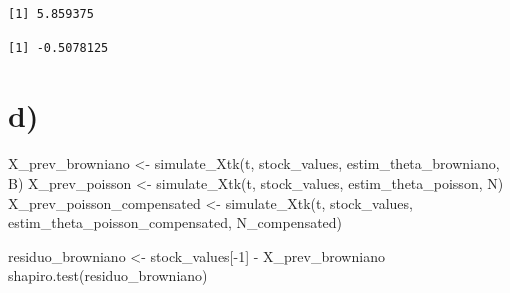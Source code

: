 \documentclass[
  letterpaper,
  DIV=11,
  numbers=noendperiod]{scrreprt}
\newenvironment{Shaded}{\begin{snugshade}}{\end{snugshade}}
\newcommand{\AttributeTok}[1]{\textcolor[rgb]{0.40,0.45,0.13}{#1}}
\newcommand{\DecValTok}[1]{\textcolor[rgb]{0.68,0.00,0.00}{#1}}
\newcommand{\DocumentationTok}[1]{\textcolor[rgb]{0.37,0.37,0.37}{\textit{#1}}}
\newcommand{\FunctionTok}[1]{\textcolor[rgb]{0.28,0.35,0.67}{#1}}
\newcommand{\NormalTok}[1]{\textcolor[rgb]{0.00,0.23,0.31}{#1}}
\newcommand{\OtherTok}[1]{\textcolor[rgb]{0.00,0.23,0.31}{#1}}
\newcommand{\SpecialCharTok}[1]{\textcolor[rgb]{0.37,0.37,0.37}{#1}}
\begin{document}
\begin{Shaded}
\end{Shaded}

\begin{verbatim}
[1] 5.859375
\end{verbatim}

\begin{Shaded}
\end{Shaded}

\begin{verbatim}
[1] -0.5078125
\end{verbatim}

\hypertarget{d}{%
\section*{d)}\label{d}}


\begin{Shaded}
\begin{Highlighting}[]
\NormalTok{X\_prev\_browniano }\OtherTok{\textless{}{-}}
  \FunctionTok{simulate\_Xtk}\NormalTok{(t, stock\_values, estim\_theta\_browniano, B)}
\NormalTok{X\_prev\_poisson }\OtherTok{\textless{}{-}}
  \FunctionTok{simulate\_Xtk}\NormalTok{(t, stock\_values, estim\_theta\_poisson, N)}
\NormalTok{X\_prev\_poisson\_compensated }\OtherTok{\textless{}{-}}
  \FunctionTok{simulate\_Xtk}\NormalTok{(t, stock\_values, estim\_theta\_poisson\_compensated, N\_compensated)}

\NormalTok{residuo\_browniano }\OtherTok{\textless{}{-}}\NormalTok{ stock\_values[}\SpecialCharTok{{-}}\DecValTok{1}\NormalTok{] }\SpecialCharTok{{-}}\NormalTok{ X\_prev\_browniano}
\FunctionTok{shapiro.test}\NormalTok{(residuo\_browniano)}
\end{Highlighting}
\end{Shaded}
\end{document}
